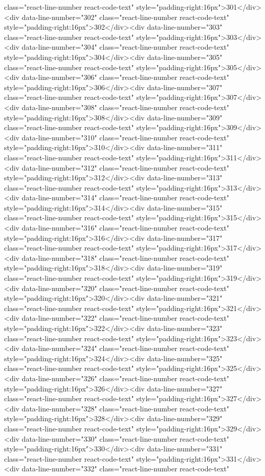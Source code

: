 {{{{{class="react-line-number react-code-text" style="padding-right:16px">301</div><div data-line-number="302" class="react-line-number react-code-text" style="padding-right:16px">302</div><div data-line-number="303" class="react-line-number react-code-text" style="padding-right:16px">303</div><div data-line-number="304" class="react-line-number react-code-text" style="padding-right:16px">304</div><div data-line-number="305" class="react-line-number react-code-text" style="padding-right:16px">305</div><div data-line-number="306" class="react-line-number react-code-text" style="padding-right:16px">306</div><div data-line-number="307" class="react-line-number react-code-text" style="padding-right:16px">307</div><div data-line-number="308" class="react-line-number react-code-text" style="padding-right:16px">308</div><div data-line-number="309" class="react-line-number react-code-text" style="padding-right:16px">309</div><div data-line-number="310" class="react-line-number react-code-text" style="padding-right:16px">310</div><div data-line-number="311" class="react-line-number react-code-text" style="padding-right:16px">311</div><div data-line-number="312" class="react-line-number react-code-text" style="padding-right:16px">312</div><div data-line-number="313" class="react-line-number react-code-text" style="padding-right:16px">313</div><div data-line-number="314" class="react-line-number react-code-text" style="padding-right:16px">314</div><div data-line-number="315" class="react-line-number react-code-text" style="padding-right:16px">315</div><div data-line-number="316" class="react-line-number react-code-text" style="padding-right:16px">316</div><div data-line-number="317" class="react-line-number react-code-text" style="padding-right:16px">317</div><div data-line-number="318" class="react-line-number react-code-text" style="padding-right:16px">318</div><div data-line-number="319" class="react-line-number react-code-text" style="padding-right:16px">319</div><div data-line-number="320" class="react-line-number react-code-text" style="padding-right:16px">320</div><div data-line-number="321" class="react-line-number react-code-text" style="padding-right:16px">321</div><div data-line-number="322" class="react-line-number react-code-text" style="padding-right:16px">322</div><div data-line-number="323" class="react-line-number react-code-text" style="padding-right:16px">323</div><div data-line-number="324" class="react-line-number react-code-text" style="padding-right:16px">324</div><div data-line-number="325" class="react-line-number react-code-text" style="padding-right:16px">325</div><div data-line-number="326" class="react-line-number react-code-text" style="padding-right:16px">326</div><div data-line-number="327" class="react-line-number react-code-text" style="padding-right:16px">327</div><div data-line-number="328" class="react-line-number react-code-text" style="padding-right:16px">328</div><div data-line-number="329" class="react-line-number react-code-text" style="padding-right:16px">329</div><div data-line-number="330" class="react-line-number react-code-text" style="padding-right:16px">330</div><div data-line-number="331" class="react-line-number react-code-text" style="padding-right:16px">331</div><div data-line-number="332" class="react-line-number react-code-text" }}}}}
